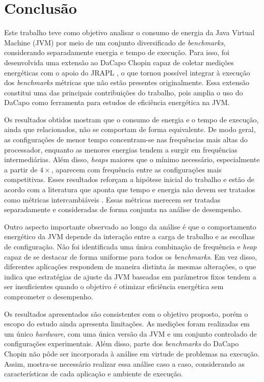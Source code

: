 \chapter{Conclusão}

Este trabalho teve como objetivo analisar o consumo de energia da Java Virtual
Machine (JVM) por meio de um conjunto diversificado de \textit{benchmarks},
considerando separadamente energia e tempo de execução. Para isso, foi
desenvolvida uma extensão ao DaCapo Chopin \cite{dacapochopin} capaz de
coletar medições energéticas com o apoio do JRAPL \cite{jrapl}, o que tornou
possível integrar à execução dos \textit{benchmarks} métricas que não
estão presentes originalmente. Essa extensão constitui uma das
principais contribuições do trabalho, pois amplia o uso do DaCapo como
ferramenta para estudos de eficiência energética na JVM.

Os resultados obtidos mostram que o consumo de energia e o tempo de execução, ainda
que relacionados, não se comportam de forma equivalente. De modo geral, as
configurações de menor tempo concentram-se nas frequências mais altas do
processador, enquanto as menores energias tendem a surgir em frequências
intermediárias. Além disso, \textit{heaps} maiores que o mínimo necessário,
especialmente a partir de \(4\times\), aparecem com frequência
entre as configurações mais competitivas. Esses resultados reforçam a hipótese
inicial do trabalho e estão de acordo com a literatura que aponta que tempo e
energia não devem ser tratados como métricas intercambiáveis \cite{programming_lang_energy}. 
Essas métricas merecem ser tratadas separadamente e consideradas de forma conjunta na análise de 
desempenho.

Outro aspecto importante observado ao longo da análise é que o comportamento
energético da JVM depende da interação entre a carga de trabalho e as escolhas
de configuração. Não foi identificada uma única combinação de frequência e
\textit{heap} capaz de se destacar de forma uniforme para todos os
\textit{benchmarks}. Em vez disso, diferentes aplicações respondem de maneira
distinta às mesmas alterações, o que indica que estratégias de ajuste da JVM
baseadas em parâmetros fixos tendem a ser insuficientes quando o objetivo é
otimizar eficiência energética sem comprometer o desempenho.

Os resultados apresentados são consistentes com o objetivo proposto, porém o escopo do
estudo ainda apresenta limitações. As medições foram realizadas em um único 
\textit{hardware}, com uma única versão da JVM e um conjunto
controlado de configurações experimentais. Além disso, parte dos
\textit{benchmarks} do DaCapo Chopin não pôde ser incorporada à análise em
virtude de problemas na execução. Assim, mostra-se necessário realizar essa 
análise caso a caso, considerando as características de cada aplicação e 
ambiente de execução.

